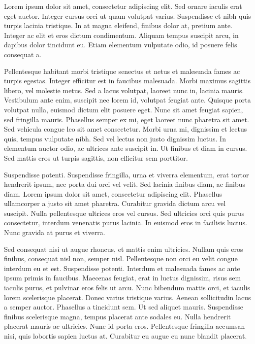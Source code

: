 \documentclass[english,,man]{apa6}
\begin{document}
Lorem ipsum dolor sit amet, consectetur adipiscing elit. Sed ornare iaculis erat eget auctor. Integer cursus orci ut quam volutpat varius. Suspendisse et nibh quis turpis lacinia tristique. In at magna eleifend, finibus dolor at, pretium ante. Integer ac elit et eros dictum condimentum. Aliquam tempus suscipit arcu, in dapibus dolor tincidunt eu. Etiam elementum vulputate odio, id posuere felis consequat a.

Pellentesque habitant morbi tristique senectus et netus et malesuada fames ac turpis egestas. Integer efficitur est in faucibus malesuada. Morbi maximus sagittis libero, vel molestie metus. Sed a lacus volutpat, laoreet nunc in, lacinia mauris. Vestibulum ante enim, suscipit nec lorem id, volutpat feugiat ante. Quisque porta volutpat nulla, euismod dictum elit posuere eget. Nunc sit amet feugiat sapien, sed fringilla mauris. Phasellus semper ex mi, eget laoreet nunc pharetra sit amet. Sed vehicula congue leo sit amet consectetur. Morbi urna mi, dignissim et lectus quis, tempus vulputate nibh. Sed vel lectus non justo dignissim luctus. In elementum auctor odio, ac ultrices ante suscipit in. Ut finibus et diam in cursus. Sed mattis eros ut turpis sagittis, non efficitur sem porttitor.

Suspendisse potenti. Suspendisse fringilla, urna et viverra elementum, erat tortor hendrerit ipsum, nec porta dui orci vel velit. Sed lacinia finibus diam, ac finibus diam. Lorem ipsum dolor sit amet, consectetur adipiscing elit. Phasellus ullamcorper a justo sit amet pharetra. Curabitur gravida dictum arcu vel suscipit. Nulla pellentesque ultrices eros vel cursus. Sed ultricies orci quis purus consectetur, interdum venenatis purus lacinia. In euismod eros in facilisis luctus. Nunc gravida at purus et viverra.

Sed consequat nisi ut augue rhoncus, et mattis enim ultricies. Nullam quis eros finibus, consequat nisl non, semper nisl. Pellentesque non orci eu velit congue interdum eu et est. Suspendisse potenti. Interdum et malesuada fames ac ante ipsum primis in faucibus. Maecenas feugiat, erat in luctus dignissim, risus sem iaculis purus, et pulvinar eros felis ut arcu. Nunc bibendum mattis orci, et iaculis lorem scelerisque placerat. Donec varius tristique varius. Aenean sollicitudin lacus a semper auctor. Phasellus a tincidunt sem. Ut sed aliquet mauris. Suspendisse finibus scelerisque magna, tempus placerat ante sodales eu. Nulla hendrerit placerat mauris ac ultricies. Nunc id porta eros. Pellentesque fringilla accumsan nisi, quis lobortis sapien luctus at. Curabitur eu augue eu nunc blandit placerat.
\end{document}
